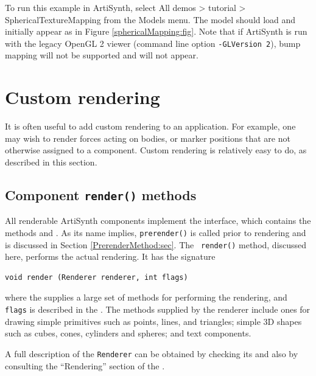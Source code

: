 To run this example in ArtiSynth, select {\sf All demos > tutorial >
SphericalTextureMapping} from the {\sf Models} menu. The model should
load and initially appear as in Figure
\ref{sphericalMapping:fig}. Note that if ArtiSynth is run with the
legacy OpenGL 2 viewer (command line option {\tt -GLVersion 2}), bump
mapping will not be supported and will not appear.

\section{Custom rendering}

It is often useful to add custom rendering to an application.  For
example, one may wish to render forces acting on bodies, or marker
positions that are not otherwise assigned to a component.  Custom
rendering is relatively easy to do, as described in this section.

\subsection{Component {\tt render()} methods}
\label{RenderMethods:sec}

All renderable ArtiSynth components implement
the  interface, which
contains the methods
 and
.
As its name implies, {\tt prerender()} is called prior to rendering
and is discussed in Section \ref{PrerenderMethod:sec}.  The {\tt
render()} method, discussed here, performs the actual rendering. It
has the signature
%
\begin{lstlisting}[]
  void render (Renderer renderer, int flags)
\end{lstlisting}
%
where the
supplies a large set of methods for performing the rendering, and {\tt
flags} is described in the
.
The methods supplied by the renderer include ones for drawing simple
primitives such as points, lines, and triangles; simple 3D shapes such
as cubes, cones, cylinders and spheres; and text components.

\begin{sideblock}
A full description of the {\tt Renderer} can be obtained
by checking its 
and also by consulting the ``Rendering'' section of the
.
\end{sideblock}

